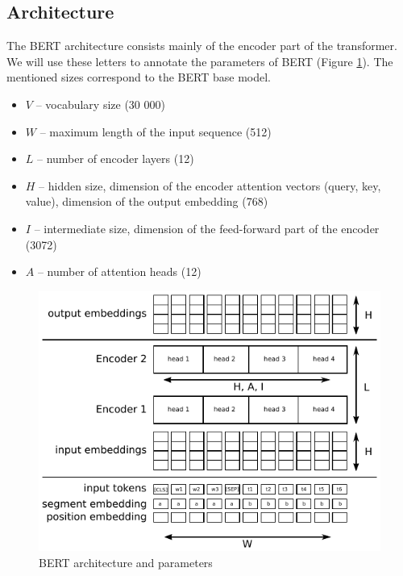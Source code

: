\documentclass[
  printed, %
  color,   %
  table,   %
  oneside, %
  lof,     %
  lot,     %
]{fithesis3}
\begin{document}
\subsection{Architecture}
\label{sec:bert_arch}
The BERT architecture consists mainly of the encoder part of the transformer. We will use these letters to annotate the parameters of BERT (Figure \ref{fig:bert}). The mentioned sizes correspond to the BERT base model.
\begin{itemize}
\itemsep0em 
\item $V$ -- vocabulary size (30 000)
\item $W$ -- maximum length of the input sequence (512)
\item $L$ -- number of encoder layers (12)
\item $H$ -- hidden size, dimension of the encoder attention vectors (query, key, value), dimension of the output embedding (768)
\item $I$ -- intermediate size, dimension of the feed-forward part of the encoder (3072)
\item $A$ -- number of attention heads (12)
\end{itemize}


\begin{figure}[h]
  \begin{center}
    \includegraphics[width=\linewidth]{img/bert_emb.pdf}
  \end{center}
  \vspace{-0.5cm}
  \caption{BERT architecture and parameters}
  \label{fig:bert}
\end{figure}
\end{document}
